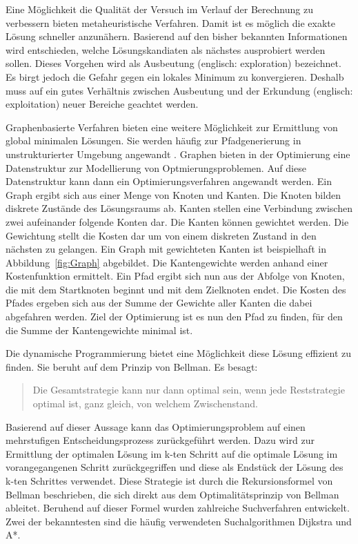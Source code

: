 Eine M\"oglichkeit die Qualit\"at der Versuch im Verlauf der Berechnung zu verbessern bieten metaheuristische Verfahren.
Damit ist es m\"oglich die exakte L\"osung schneller anzun\"ahern.
Basierend auf den bisher bekannten Informationen wird entschieden, welche L\"osungskandiaten als n\"achstes ausprobiert werden sollen.
Dieses Vorgehen wird als Ausbeutung (englisch: exploration) bezeichnet.
Es birgt jedoch die Gefahr gegen ein lokales Minimum zu konvergieren.
Deshalb muss auf ein gutes Verh\"altnis zwischen Ausbeutung und der Erkundung (englisch: exploitation) neuer Bereiche geachtet werden. \cite{Weise2009}

Graphenbasierte Verfahren bieten eine weitere M\"oglichkeit zur Ermittlung von global minimalen L\"osungen.
Sie werden h\"aufig zur Pfadgenerierung in unstrukturierter Umgebung angewandt \cite{Ziegler2017}.
Graphen bieten in der Optimierung eine Datenstruktur zur Modellierung von Optmierungsproblemen. 
Auf diese Datenstruktur kann dann ein Optimierungsverfahren angewandt werden.
Ein Graph ergibt sich aus einer Menge von Knoten und Kanten.
Die Knoten bilden diskrete Zust\"ande des L\"osungsraums ab.
Kanten stellen eine Verbindung zwischen zwei aufeinander folgende Konten dar.
Die Kanten k\"onnen gewichtet werden.
Die Gewichtung stellt die Kosten dar um von einem diskreten Zustand in den n\"achsten zu gelangen. 
Ein Graph mit gewichteten Kanten ist beispielhaft in Abbildung~\ref{fig:Graph} abgebildet.
Die Kantengewichte werden anhand einer Kostenfunktion ermittelt.
Ein Pfad ergibt sich nun aus der Abfolge von Knoten, die mit dem Startknoten beginnt und mit dem Zielknoten endet.
Die Kosten des Pfades ergeben sich aus der Summe der Gewichte aller Kanten die dabei abgefahren werden. \cite{Ziegler2017}
Ziel der Optimierung ist es nun den Pfad zu finden, f\"ur den die Summe der Kantengewichte minimal ist.

Die dynamische Programmierung bietet eine M\"oglichkeit diese L\"osung effizient zu finden.
Sie beruht auf dem Prinzip von Bellman.
Es besagt:

\begin{quote}
    \glqq Die Gesamtstrategie kann nur dann optimal sein, wenn jede Reststrategie optimal ist, ganz gleich, von welchem Zwischenstand. \grqq{}
\end{quote}

Basierend auf dieser Aussage kann das Optimierungsproblem auf einen mehrstufigen Entscheidungsprozess zur\"uckgef\"uhrt werden. 
Dazu wird zur Ermittlung der optimalen L\"osung im k-ten Schritt auf die optimale L\"osung im vorangegangenen Schritt zur\"uckgegriffen und diese als Endst\"uck der L\"osung des k-ten Schrittes verwendet. 
Diese Strategie ist durch die Rekursionsformel von Bellman beschrieben, die sich direkt aus dem Optimalit\"atsprinzip von Bellman ableitet. 
Beruhend auf dieser Formel wurden zahlreiche Suchverfahren entwickelt. 
Zwei der bekanntesten sind die h\"aufig verwendeten Suchalgorithmen Dijkstra und A*. \cite{Follinger1988}

